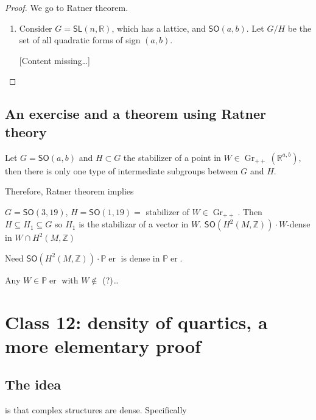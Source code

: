 \begin{proof}\leavevmode
	We go to Ratner theorem.

	\begin{enumerate}[label=\textbf{Step \arabic*}]
		\item Consider $G=\mathsf{SL}(n,\mathbb{R})$, which has a lattice, and $\mathsf{SO}(a,b)$. Let $G/H$ be the set of all quadratic forms of sign $(a,b)$.

			[Content missing…]
	\end{enumerate}
\end{proof}

\subsection{An exercise and a theorem using Ratner theory}

\begin{exercise}\leavevmode
	Let $G=\mathsf{SO}(a,b)$ and $H\subset G$ the stabilizer of a point in $W\in\operatorname{Gr}_{++}(\mathbb{R}^{a,b})$, then there is only one type of intermediate subgroups between $G$ and $H$.
\end{exercise}

Therefore, Ratner theorem implies

\begin{prop}\leavevmode
	$G=\mathsf{SO}(3,19)$, $H=\mathsf{SO}(1,19)=$ stabilizer of $W\in\operatorname{Gr}_{++}$. Then $H\subseteq H_1\subseteq G$ so $H_1$ is the stabilizar of a vector in $W$. $\mathsf{SO}(H^{2}(M,\mathbb{Z})) \cdot W$-dense in $W\cap H^{2}(M,\mathbb{Z})$ 

	\begin{idea4}{Need}\leavevmode
		$\mathsf{SO}(H^{2}(M,\mathbb{Z})) \cdot \mathbb{P}\operatorname{er}$ is dense in $\mathbb{P}\operatorname{er}$.
	\end{idea4}
	Any $W\in\mathbb{P}\operatorname{er}$ with $W \not\in$ (?)…
\end{prop}

\section{Class 12: density of quartics, a more elementary proof}

\subsection{The idea}
is that complex structures are dense. Specifically

